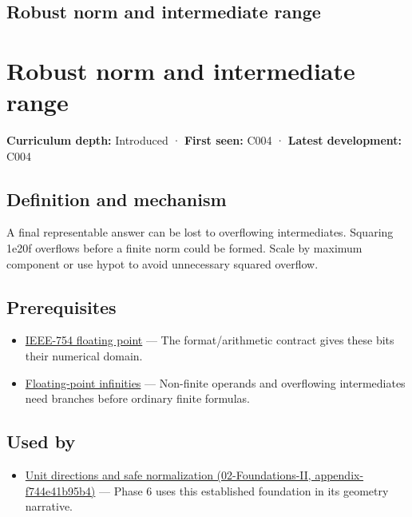 \hypertarget{appendix-7f1e17dcafb1}{}
\section*{Robust norm and intermediate range}
\chapter{Robust norm and intermediate range}\label{appendix-7f1e17dcafb1-robust-norm-and-intermediate-range}

\textbf{Curriculum depth:} Introduced · \textbf{First seen:} C004 · \textbf{Latest development:} C004

\section{Definition and mechanism}\label{appendix-7f1e17dcafb1-definition-and-mechanism}

A final representable answer can be lost to overflowing intermediates. Squaring 1e20f overflows before a finite norm could be formed. Scale by maximum component or use hypot to avoid unnecessary squared overflow.

\section{Prerequisites}\label{appendix-7f1e17dcafb1-prerequisites}

\begin{itemize}
\tightlist
\item
  \hyperref[appendix-343615f49ddf]{IEEE-754 floating point} --- The format/arithmetic contract gives these bits their numerical domain.
\item
  \hyperref[appendix-eb336149c00a]{Floating-point infinities} --- Non-finite operands and overflowing intermediates need branches before ordinary finite formulas.
\end{itemize}

\section{Used by}\label{appendix-7f1e17dcafb1-used-by}

\begin{itemize}
\tightlist
\item
  \href{../02-Foundations-II/main.pdf\#nameddest=appendix-f744e41b95b4}{Unit directions and safe normalization (02-Foundations-II, appendix-f744e41b95b4)} --- Phase 6 uses this established foundation in its geometry narrative.
\end{itemize}

